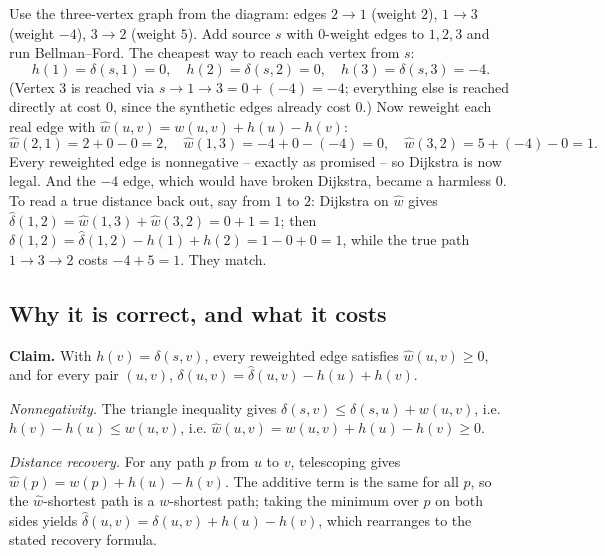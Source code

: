 \begin{labbox}
Use the three-vertex graph from the diagram: edges $2 \to 1$ (weight $2$),
$1 \to 3$ (weight $-4$), $3 \to 2$ (weight $5$). Add source $s$ with
$0$-weight edges to $1, 2, 3$ and run Bellman--Ford. The cheapest way to reach
each vertex from $s$:
\[
h(1) = \delta(s,1) = 0,\quad h(2) = \delta(s,2) = 0,\quad h(3) = \delta(s,3) = -4.
\]
(Vertex $3$ is reached via $s \to 1 \to 3 = 0 + (-4) = -4$; everything else is
reached directly at cost $0$, since the synthetic edges already cost $0$.)
Now reweight each real edge with $\hat{w}(u,v) = w(u,v) + h(u) - h(v)$:
\[
\hat{w}(2,1) = 2 + 0 - 0 = 2,\quad
\hat{w}(1,3) = -4 + 0 - (-4) = 0,\quad
\hat{w}(3,2) = 5 + (-4) - 0 = 1.
\]
Every reweighted edge is nonnegative -- exactly as promised -- so Dijkstra is
now legal. And the $-4$ edge, which would have broken Dijkstra, became a
harmless $0$. To read a true distance back out, say from $1$ to $2$: Dijkstra
on $\hat{w}$ gives $\hat\delta(1,2) = \hat{w}(1,3) + \hat{w}(3,2) = 0 + 1 = 1$;
then $\delta(1,2) = \hat\delta(1,2) - h(1) + h(2) = 1 - 0 + 0 = 1$, while the
true path $1 \to 3 \to 2$ costs $-4 + 5 = 1$. They match.
\end{labbox}

\subsection{Why it is correct, and what it costs}

\begin{formalbox}
\textbf{Claim.} With $h(v) = \delta(s, v)$, every reweighted edge satisfies
$\hat{w}(u,v) \ge 0$, and for every pair $(u, v)$,
$\delta(u, v) = \hat\delta(u, v) - h(u) + h(v)$.

\emph{Nonnegativity.} The triangle inequality gives $\delta(s,v) \le
\delta(s,u) + w(u,v)$, i.e. $h(v) - h(u) \le w(u,v)$, i.e.
$\hat{w}(u,v) = w(u,v) + h(u) - h(v) \ge 0$.

\emph{Distance recovery.} For any path $p$ from $u$ to $v$, telescoping gives
$\hat{w}(p) = w(p) + h(u) - h(v)$. The additive term is the same for all $p$,
so the $\hat{w}$-shortest path is a $w$-shortest path; taking the minimum over
$p$ on both sides yields $\hat\delta(u,v) = \delta(u,v) + h(u) - h(v)$, which
rearranges to the stated recovery formula.
\end{formalbox}

